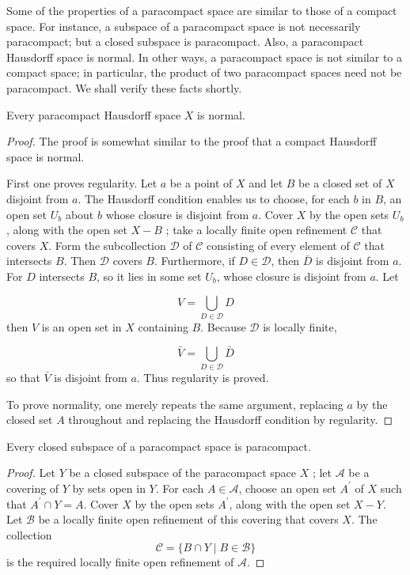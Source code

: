 Some of the properties of a paracompact space are similar to those of a compact space. For instance, a subspace of a paracompact space is not necessarily paracompact; but a closed subspace is paracompact. Also, a paracompact Hausdorff space is normal. In other ways, a paracompact space is not similar to a compact space; in particular, the product of two paracompact spaces need not be paracompact. We shall verify these facts shortly.

\begin{theorem}
\label{thm:\thetheorem}
 Every paracompact Hausdorff space \(X\) is normal.
\end{theorem}

\begin{proof}
 The proof is somewhat similar to the proof that a compact Hausdorff space is normal.

First one proves regularity. Let \(a\) be a point of \(X\) and let \(B\) be a closed set of \(X\) disjoint from \(a\). The Hausdorff condition enables us to choose, for each \(b\) in \(B\), an open set \(U_{b}\) about \(b\) whose closure is disjoint from \(a\). Cover \(X\) by the open sets \(U_{b}\), along with the open set \(X - B\) ; take a locally finite open refinement \(\mathcal{C}\) that covers \(X\). Form the subcollection \(\mathcal{D}\) of \(\mathcal{C}\) consisting of every element of \(\mathcal{C}\) that intersects \(B\). Then \(\mathcal{D}\) covers \(B\). Furthermore, if \(D \in \mathcal{D}\), then \(\bar{D}\) is disjoint from \(a\). For \(D\) intersects \(B\), so it lies in some set \(U_{b}\), whose closure is disjoint from \(a\). Let

\[
V = \mathop{\bigcup }\limits_{{D \in \mathcal{D}}}D
\]
then \(V\) is an open set in \(X\) containing \(B\). Because \(\mathcal{D}\) is locally finite,

\[
\bar{V} = \mathop{\bigcup }\limits_{{D \in \mathcal{D}}}\bar{D}
\]
so that \(\bar{V}\) is disjoint from \(a\). Thus regularity is proved.

To prove normality, one merely repeats the same argument, replacing \(a\) by the closed set \(A\) throughout and replacing the Hausdorff condition by regularity.
\end{proof}

\begin{theorem}
\label{thm:\thetheorem}
 Every closed subspace of a paracompact space is paracompact.
\end{theorem}

\begin{proof}
 Let \(Y\) be a closed subspace of the paracompact space \(X\) ; let \(\mathcal{A}\) be a covering of \(Y\) by sets open in \(Y\). For each \(A \in \mathcal{A}\), choose an open set \(A^{\prime }\) of \(X\) such that \(A^{\prime } \cap Y = A\). Cover \(X\) by the open sets \(A^{\prime }\), along with the open set \(X - Y\). Let \(\mathcal{B}\) be a locally finite open refinement of this covering that covers \(X\). The collection
\[
\mathcal{C} = \{ B \cap Y \mid B \in \mathcal{B}\}
\]
is the required locally finite open refinement of \(\mathcal{A}\).
\end{proof}

